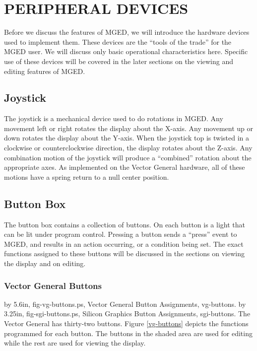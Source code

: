 \chapter{PERIPHERAL DEVICES}

Before we discuss the features of MGED, we will introduce
the hardware devices used to implement them.
These devices are the ``tools of the trade'' for the MGED user.
We will discuss only basic operational characteristics here.
Specific use of these devices will be covered in the later sections
on the viewing and editing features of MGED.

\section{Joystick}

The joystick is a mechanical device used to do rotations in MGED.
Any movement left or right rotates the display about the
X-axis.  Any movement up or down rotates the display
about the Y-axis.  When the joystick top is twisted in a clockwise or
counterclockwise direction, the display rotates about the Z-axis.
Any combination motion of the joystick will produce a ``combined''
rotation about the appropriate axes.
As implemented on the Vector General hardware,
all of these motions have a spring return to a null center position.

\section{Button Box}

The button box contains a collection of buttons.
On each button is a light that can be lit under program control.
Pressing a button sends a ``press'' event to MGED,
and results in an action occurring, or a condition being set.
The exact functions assigned to these buttons will be discussed
in the sections on viewing the display and on editing.

\subsection{Vector General Buttons}

\PostScriptPicture 6in by 5.6in, fig-vg-buttons.ps, Vector General Button Assignments, vg-buttons.
\PostScriptPicture 4.5in by 3.25in, fig-sgi-buttons.ps, Silicon Graphics Button Assignments, sgi-buttons.
The Vector General has thirty-two buttons.
Figure \ref{vg-buttons} depicts the functions programmed
for each button.
The buttons in the shaded area are used for editing while the
rest are used for viewing the display.

